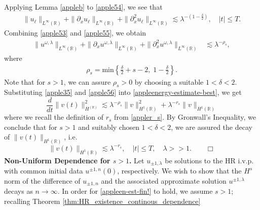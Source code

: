 \documentclass[12pt,reqno]{amsart}
\newcommand{\rr}{\mathbb{R}}
\newcommand{\p}{\partial}
\theoremstyle{plain}  %
\theoremstyle{definition}
\begin{document}
Applying Lemma \ref{appleb} to \eqref{apple54}, we see that
\begin{equation}
	\begin{split}
		\|u_\ell\|_{L^\infty(\rr)} + \|\p_x u_\ell \|_{L^\infty(\rr)} + \|\p_x^2
		u_\ell\|_{L^\infty(\rr)} \lesssim \lambda^{-(1 - \frac{\delta}{2})},
		\quad |t| \le T.
		\label{apple55}
	\end{split}
\end{equation}
Combining \eqref{apple53} and \eqref{apple55}, we obtain
\begin{equation}
	\begin{split}
		\|u^{\omega,\lambda}\|_{L^\infty(\rr)} + \|\p_x u^{\omega,\lambda}\|_{L^\infty(\rr)} + \|\p_x^2
		u^{\omega,\lambda}\|_{L^\infty(\rr)}
		& \lesssim \lambda^{-\rho_s},
		\label{apple56}
	\end{split}
\end{equation}
where
\begin{equation}
	\begin{split}
		\rho_s = \text{min} \left\{ \frac{\delta}{2} + s -2, \; 1-
		\frac{\delta}{2} \right\}.
		\label{apple57}
	\end{split}
\end{equation}
Note that for $s>1$, we can assure $\rho_s > 0$
by choosing a suitable $1<\delta<2$.
Substituting \eqref{apple35} and \eqref{apple56} into \eqref{appleenergy-estimate-best},
we get
\begin{equation}
	\label{apple58}
	\frac{d}{dt} \|v(t)\|_{H^(\rr)}^2 \lesssim \lambda^{-\rho_s}
	\|v\|_{H^1(\rr)}^2 + \lambda^{-r_s}
	\|v \|_{H^1(\rr)}
\end{equation}
where we recall the definition of $r_s$ from \eqref{appler_s}. By Gronwall's Inequality, we conclude that for $s>1$ and
suitably chosen $1<\delta<2$, we are assured the
decay of $\|v(t)\|_{H^1(\rr)}$, i.e. 
\begin{equation}
	\label{appleen-est-fin!}
	\|v(t)\|_{H^1(\rr)} 
	\lesssim
	\lambda^{-r_s}, \quad |t| \le T,\quad \lambda>>1 . \qquad \Box
\end{equation}
%
%
%
\vskip0.1in
{\bf Non-Uniform Dependence for $s > 1$.}
\vskip0.1in
Let $u_{\pm 1,\lambda}$ be solutions to the HR i.v.p. with common initial data $u^{\pm 1,
n}(0)$, respectively.
We wish to show that the $H^s$ norm of the difference of $u_{\pm 1,
n}$ and the associated approximate solution $u^{\pm 1,\lambda}$
decays as $n \to \infty$. In order for \eqref{appleen-est-fin!} to hold,
we assume $s > 1$; recalling Theorem \ref{thm:HR_existence_continous_dependence}
\end{document}
